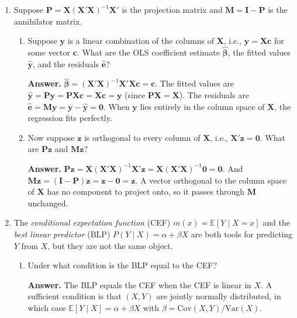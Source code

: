 \documentclass{article}
\begin{document}
\begin{enumerate}

\item Suppose $\bm{P} = \bm{X}(\bm{X}'\bm{X})^{-1}\bm{X}'$ is the projection matrix and $\bm{M} = \bm{I} - \bm{P}$ is the annihilator matrix.

\begin{enumerate}
  \item Suppose $\bm{y}$ is a linear combination of the columns of $\bm{X}$, i.e., $\bm{y} = \bm{X}\bm{c}$ for some vector $\bm{c}$. What are the OLS coefficient estimate $\hat{\bm{\beta}}$, the fitted values $\hat{\bm{y}}$, and the residuals $\hat{\bm{e}}$?

  \textbf{Answer.} $\hat{\bm{\beta}} = (\bm{X}'\bm{X})^{-1}\bm{X}'\bm{X}\bm{c} = \bm{c}$. The fitted values are $\hat{\bm{y}} = \bm{P}\bm{y} = \bm{P}\bm{X}\bm{c} = \bm{X}\bm{c} = \bm{y}$ (since $\bm{PX} = \bm{X}$). The residuals are $\hat{\bm{e}} = \bm{M}\bm{y} = \bm{y} - \hat{\bm{y}} = \bm{0}$. When $\bm{y}$ lies entirely in the column space of $\bm{X}$, the regression fits perfectly.

  \item Now suppose $\bm{z}$ is orthogonal to every column of $\bm{X}$, i.e., $\bm{X}'\bm{z} = \bm{0}$. What are $\bm{Pz}$ and $\bm{Mz}$?

  \textbf{Answer.} $\bm{Pz} = \bm{X}(\bm{X}'\bm{X})^{-1}\bm{X}'\bm{z} = \bm{X}(\bm{X}'\bm{X})^{-1}\bm{0} = \bm{0}$. And $\bm{Mz} = (\bm{I} - \bm{P})\bm{z} = \bm{z} - \bm{0} = \bm{z}$.  A vector orthogonal to the column space of $\bm{X}$ has no component to project onto, so it passes through $\bm{M}$ unchanged.
\end{enumerate}

\item The \emph{conditional expectation function} (CEF) $m(x) = \mathbb{E}[Y \mid X = x]$ and the \emph{best linear predictor} (BLP) $P(Y \mid X) = \alpha + \beta X$ are both tools for predicting $Y$ from $X$, but they are not the same object.

\begin{enumerate}
  \item Under what condition is the BLP equal to the CEF?

  \textbf{Answer.} The BLP equals the CEF when the CEF is linear in $X$. A sufficient condition is that $(X, Y)$ are jointly normally distributed, in which case $\mathbb{E}[Y \mid X] = \alpha + \beta X$ with $\beta = \text{Cov}(X,Y)/\text{Var}(X)$.


\end{enumerate}
\end{enumerate}
\end{document}
